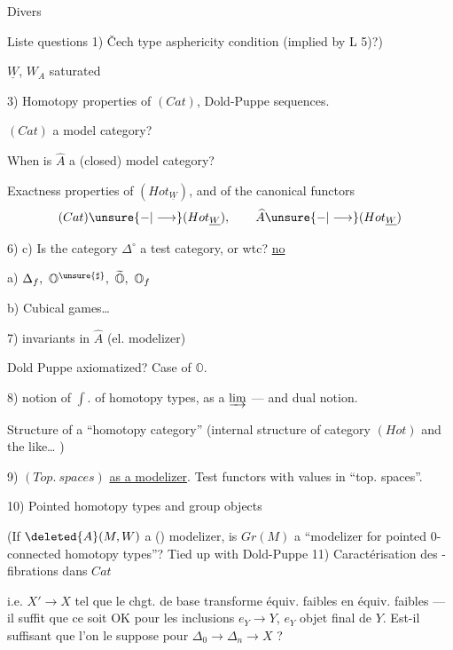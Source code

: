 Divers

Liste questions
1) \v{C}ech type asphericity condition (implied by L 5)?)

 $\underline W$, $W_A$ saturated

3) Homotopy properties of $(Cat)$,  Dold-Puppe sequences.

$(Cat)$ a model category?

 When is $\widehat A$ a (closed) model category?

 Exactness properties of $(Hot_{\underline W})$, and of the canonical functors
\[
(Cat)\unsure{-|\longrightarrow}(Hot_{\underline W}),\qquad
\widehat A\unsure{-|\longrightarrow}(Hot_{\underline W})
\]

6) c) Is the category $\Delta^\circ$ a test category, or wtc? \uline{no}

a)  $\Delta_f,\ \mathbb O^{\unsure{\sharp}},\ \widetilde{\mathbb O},\ \mathbb O_f$

b) Cubical games\ldots

7)  invariants in $\widehat A$ (el. modelizer)

Dold Puppe axiomatized? Case of $\mathbb O$.

8)  notion of $\int.$ of homotopy types, as a $\varinjlim$ --- and dual notion.

Structure of a ``homotopy category'' (internal structure of category $(Hot)$ and the like\ldots
{})

9) $(Top.\ spaces)$ \uline{as a modelizer}. Test functors with values in ``top. spaces''.

10) Pointed homotopy types and group objects

(If $\deleted{A}(M,W)$ a () modelizer, is $Gr(M)$  a ``modelizer for pointed 0-connected homotopy types''? Tied up with Dold-Puppe 
11) Caractérisation des -fibrations dans $Cat$

i.e. $X'\longrightarrow X$ tel que le chgt. de base transforme équiv. faibles en équiv. faibles --- il suffit que ce soit OK pour les inclusions $e_Y\longrightarrow Y$, $e_Y$ objet final de $Y$. Est-il suffisant que l'on le suppose pour  $\Delta_0\longrightarrow\Delta_n\longrightarrow X$ ?

